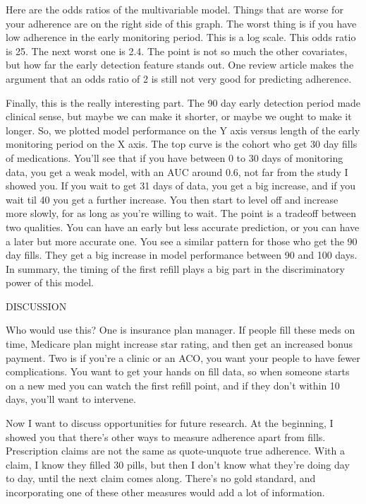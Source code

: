 \documentclass[12pt]{report}
\begin{document}
\begin{large}
Here are the odds ratios of the multivariable model. Things that are
worse for your adherence are on the right side of this graph. The
worst thing is if you have low adherence in the early monitoring
period. This is a log scale. This odds ratio is 25. The next worst one
is 2.4. The point is not so much the other covariates, but how far the
early detection feature stands out. One review article makes the
argument that an odds ratio of 2 is still not very good for predicting
adherence.

Finally, this is the really interesting part. The 90 day early
detection period made clinical sense, but maybe we can make it
shorter, or maybe we ought to make it longer. So, we plotted model
performance on the Y axis versus length of the early monitoring period
on the X axis. The top curve is the cohort who get 30 day fills of
medications. You'll see that if you have between 0 to 30 days of
monitoring data, you get a weak model, with an AUC around 0.6, not far
from the study I showed you. If you wait to get 31 days of data, you
get a big increase, and if you wait til 40 you get a further increase.
You then start to level off and increase more slowly, for as long as
you're willing to wait. The point is a tradeoff between two qualities.
You can have an early but less accurate prediction, or you can have a
later but more accurate one. You see a similar pattern for those who
get the 90 day fills. They get a big increase in model performance
between 90 and 100 days. In summary, the timing of the first refill
plays a big part in the discriminatory power of this model.

DISCUSSION

Who would use this? One is insurance plan manager. If people fill
these meds on time, Medicare plan might increase star rating, and then
get an increased bonus payment. Two is if you're a clinic or an ACO,
you want your people to have fewer complications. You want to get your
hands on fill data, so when someone starts on a new med you can watch
the first refill point, and if they don't within 10 days, you'll want
to intervene.

Now I want to discuss opportunities for future research. At the
beginning, I showed you that there's other ways to measure adherence
apart from fills. Prescription claims are not the same as
quote-unquote true adherence. With a claim, I know they filled 30
pills, but then I don't know what they're doing day to day, until the
next claim comes along. There's no gold standard, and incorporating
one of these other measures would add a lot of information.


\end{large}
\end{document}
